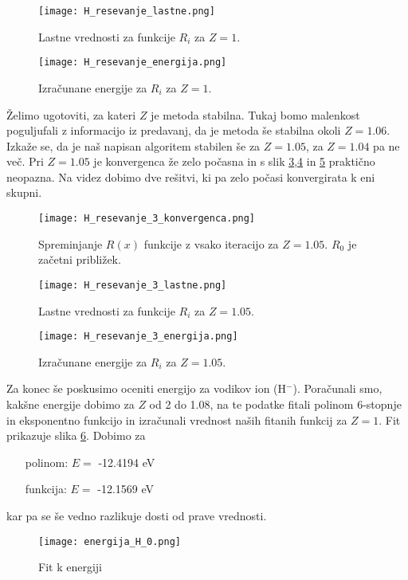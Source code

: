 \documentclass[12pt,a4paper]{article}
\begin{document}
\begin{figure}[H]
\begin{center}
\texttt{[image: H\_resevanje\_lastne.png]}
\caption{Lastne vrednosti za funkcije $R_i$ za $Z=1$. } \label{fig:slika8}
\end{center}
\end{figure}

\begin{figure}[H]
\begin{center}
\texttt{[image: H\_resevanje\_energija.png]}
\caption{Izračunane energije za $R_i$ za $Z=1$. } \label{fig:slika9}
\end{center}
\end{figure}

Želimo ugotoviti, za kateri $Z$ je metoda stabilna. Tukaj bomo malenkost poguljufali z informacijo iz predavanj, da je metoda še stabilna okoli $Z=1.06$. Izkaže se, da je naš napisan algoritem stabilen še za $Z=1.05$, za $Z=1.04$ pa ne več. Pri $Z=1.05$ je konvergenca že zelo počasna in s slik \ref{fig:slika10},\ref{fig:slika11} in \ref{fig:slika12} praktično neopazna. Na videz dobimo dve rešitvi, ki pa zelo počasi konvergirata k eni skupni.


\begin{figure}[H]
\begin{center}
\texttt{[image: H\_resevanje\_3\_konvergenca.png]}
\caption{Spreminjanje $R(x)$ funkcije z vsako iteracijo za $Z=1.05$. $R_0$ je začetni približek. } \label{fig:slika10}
\end{center}
\end{figure}

\begin{figure}[H]
\begin{center}
\texttt{[image: H\_resevanje\_3\_lastne.png]}
\caption{Lastne vrednosti za funkcije $R_i$ za $Z=1.05$. } \label{fig:slika11}
\end{center}
\end{figure}

\begin{figure}[H]
\begin{center}
\texttt{[image: H\_resevanje\_3\_energija.png]}
\caption{Izračunane energije za $R_i$ za $Z=1.05$. } \label{fig:slika12}
\end{center}
\end{figure}

Za konec še poskusimo oceniti energijo za vodikov ion (H$^{-}$). Poračunali smo, kakšne energije dobimo za $Z$ od 2 do 1.08, na te podatke fitali polinom 6-stopnje in eksponentno funkcijo in izračunali vrednost naših fitanih funkcij za $Z=1$.
Fit prikazuje slika \ref{fig:slika13}. Dobimo za
\begin{itemize}
\item[polinom:] $E=$ -12.4194 eV
\item[funkcija:] $E=$ -12.1569 eV
\end{itemize}
kar pa se še vedno razlikuje dosti od prave vrednosti.

\begin{figure}[H]
\begin{center}
\texttt{[image: energija\_H\_0.png]}
\caption{Fit k energiji} \label{fig:slika13}
\end{center}
\end{figure}
\end{document}
